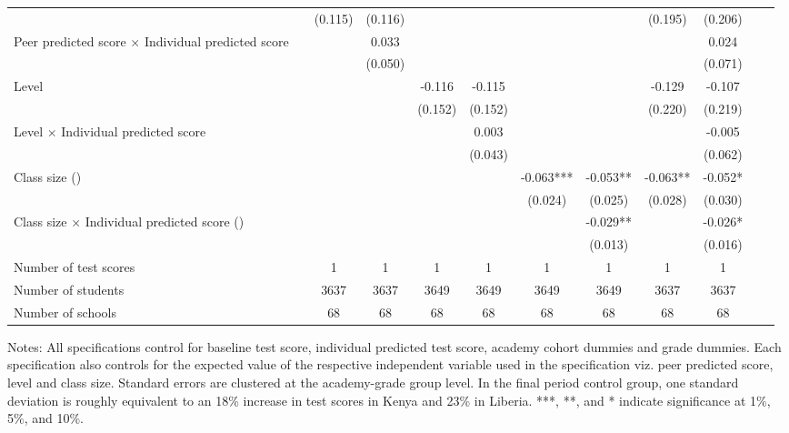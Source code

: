 \begin{center}
\begin{scriptsize}
\begin{threeparttable}
\begin{tabular} {@{} l l c c c c c c c c c c  @{}}
                 &  & (0.115) & (0.116) &  &  &  &  & (0.195) & (0.206) \\
Peer predicted score $\times$ Individual predicted score &  &  & 0.033 &  &  &  &  &  & 0.024 \\
                 &  &  & (0.050) &  &  &  &  &  & (0.071) \\
Level &  &  &  & -0.116 & -0.115 &  &  & -0.129 & -0.107 \\
                 &  &  &  & (0.152) & (0.152) &  &  & (0.220) & (0.219) \\
Level $\times$ Individual predicted score &  &  &  &  & 0.003 &  &  &  & -0.005 \\
                 &  &  &  &  & (0.043) &  &  &  & (0.062) \\
Class size (\times 10) &  &  &  &  &  & -0.063*** & -0.053** & -0.063** & -0.052* \\
                 &  &  &  &  &  & (0.024) & (0.025) & (0.028) & (0.030) \\
Class size $\times$ Individual predicted score (\times 10) &  &  &  &  &  &  & -0.029** &  & -0.026* \\
                 &  &  &  &  &  &  & (0.013) &  & (0.016) \\
\midrule
Number of test scores &  & 1 & 1 & 1 & 1 & 1 & 1 & 1 & 1 \\
Number of students &  & 3637 & 3637 & 3649 & 3649 & 3649 & 3649 & 3637 & 3637 \\
Number of schools &  & 68 & 68 & 68 & 68 & 68 & 68 & 68 & 68 \\
\bottomrule
\end{tabular}
\begin{tablenotes}
\item Notes: All specifications control for baseline test score, individual predicted test score, academy cohort dummies and grade dummies. Each specification also controls for the expected value of the respective independent variable used in the specification viz. peer predicted score, level and class size. Standard errors are clustered at the academy-grade group level. In the final period control group, one standard deviation is roughly equivalent to an 18\% increase in test scores in Kenya and 23\% in Liberia. ***, **, and * indicate significance at 1\%, 5\%, and 10\%.\end{tablenotes}
\end{threeparttable}
\end{scriptsize}
\end{center}
\clearpage
